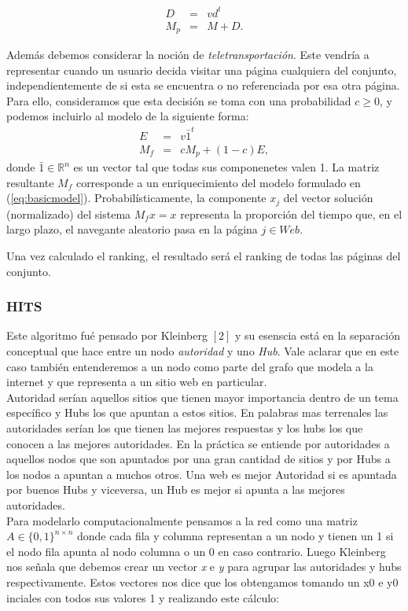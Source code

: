 \begin{eqnarray*}
D & = & v d^t \\
M_p & = & M + D.
\end{eqnarray*}
 

Además debemos considerar la noción de \emph{teletransportación}. Este vendría a representar cuando un usuario  decida visitar
una p\'agina cualquiera del conjunto, independientemente de si esta se encuentra o no referenciada por esa otra página. Para ello, consideramos que esta decisi\'on se toma con una probabilidad
$c \ge 0$, y podemos incluirlo al modelo de la siguiente forma:
\begin{eqnarray*}
E & = & v \bar{1}^t \\
M_f & = & cM_p + (1-c)E,
\end{eqnarray*}
\noindent donde $\bar{1} \in \mathbb{R}^n$ es un vector tal que todas sus componenetes valen 1. La matriz resultante
$M_f$ corresponde a un enriquecimiento del modelo formulado en (\ref{eq:basicmodel}). Probabil\'isticamente, la
componente $x_j$ del vector soluci\'on (normalizado) del sistema $M_f x = x$ representa la proporci\'on del tiempo que,
en el largo plazo, el navegante aleatorio pasa en la p\'agina $j \in Web$.

Una vez calculado el ranking, el resultado será el ranking de todas las páginas del conjunto.


\subsubsection{HITS}

Este algoritmo fué pensado por Kleinberg $[2]$ y su esenscia está en la separación conceptual que hace entre un nodo \textit{autoridad} y uno \textit{Hub}. Vale aclarar que en este caso también entenderemos a un nodo como parte del grafo que modela a la internet y que representa a un sitio web en particular. \\
Autoridad serían aquellos sitios que tienen mayor importancia dentro de un tema específico y Hubs los que apuntan a estos sitios. En palabras mas terrenales las autoridades serían los que tienen las mejores respuestas y los hubs los que conocen a las mejores autoridades.
En la práctica se entiende por autoridades a aquellos nodos que son apuntados por una gran cantidad de sitios y por Hubs a los nodos a apuntan a muchos otros. Una web es mejor Autoridad si es apuntada por buenos Hubs y viceversa, un Hub es mejor si apunta a las mejores autoridades.\\
Para modelarlo computacionalmente pensamos a la red como una matriz $A \in \{0,1\}^{n \times n}$ donde cada fila y columna representan a un nodo y tienen un 1 si el nodo fila apunta al nodo columna o un 0 en caso contrario. Luego Kleinberg nos señala que debemos crear un vector \textit{x} e \textit{y} para agrupar las autoridades y hubs respectivamente. Estos vectores nos dice que los obtengamos tomando un x0 e y0 inciales con todos sus valores 1 y realizando este cálculo:

